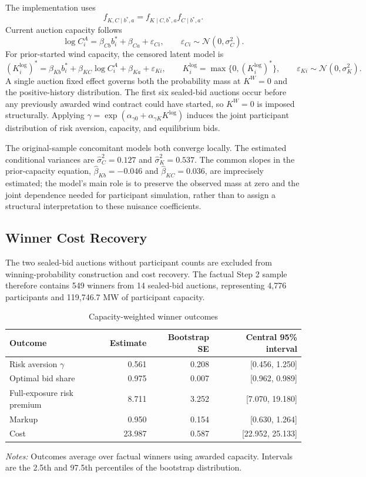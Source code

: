 \documentclass[10pt]{article}
\begin{document}
The implementation uses
\[
f_{K,C\mid b^*,a}=f_{K\mid C,b^*,a}f_{C\mid b^*,a}.
\]
Current auction capacity follows
\[
\log C_i^A
=\beta_{Cb}b_i^*+\beta_{Ca}+\varepsilon_{Ci},
\qquad \varepsilon_{Ci}\sim\mathcal N(0,\sigma_C^2).
\]
For prior-started wind capacity, the censored latent model is
\[
(K^{\log}_i)^*
=\beta_{Kb}b_i^*+\beta_{KC}\log C_i^A+\beta_{Ka}
+\varepsilon_{Ki},
\qquad
K^{\log}_i=\max\{0,(K^{\log}_i)^*\},
\qquad
\varepsilon_{Ki}\sim\mathcal N(0,\sigma_K^2).
\]
A single auction fixed effect governs both the probability mass at $K^W=0$
and the positive-history distribution. The first six sealed-bid auctions occur
before any previously awarded wind contract could have started, so $K^W=0$ is
imposed structurally. Applying
$\gamma=\exp(\alpha_{\gamma0}+\alpha_{\gamma K}K^{\log})$ induces the joint
participant distribution of risk aversion, capacity, and equilibrium bids.

The original-sample concomitant models both converge locally. The estimated
conditional variances are $\widehat\sigma_C^2=0.127$ and
$\widehat\sigma_K^2=0.537$. The common slopes in the prior-capacity equation,
$\widehat\beta_{Kb}=-0.046$ and $\widehat\beta_{KC}=0.036$, are imprecisely
estimated; the model's main role is to preserve the observed mass at zero and
the joint dependence needed for participant simulation, rather than to assign
a structural interpretation to these nuisance coefficients.

\subsection{Winner Cost Recovery}

The two sealed-bid auctions without participant counts are excluded from
winning-probability construction and cost recovery. The factual Step 2 sample
therefore contains 549 winners from 14 sealed-bid auctions, representing 4,776
participants and 119,746.7 MW of participant capacity.

\begin{table}[H]
\centering
\caption{Capacity-weighted winner outcomes}
\label{tab:winner_results}
\begin{tabular}{lrrr}
\toprule
Outcome & Estimate & Bootstrap SE & Central 95\% interval\\
\midrule
Risk aversion $\gamma$ & 0.561 & 0.208 & [0.456, 1.250]\\
Optimal bid share & 0.975 & 0.007 & [0.962, 0.989]\\
Full-exposure risk premium & 8.711 & 3.252 & [7.070, 19.180]\\
Markup & 0.950 & 0.154 & [0.630, 1.264]\\
Cost & 23.987 & 0.587 & [22.952, 25.133]\\
\bottomrule
\end{tabular}
\begin{minipage}{0.92\textwidth}
\footnotesize
\textit{Notes:} Outcomes average over factual winners using awarded capacity.
Intervals are the 2.5th and 97.5th percentiles of the bootstrap distribution.
\end{minipage}
\end{table}
\end{document}

